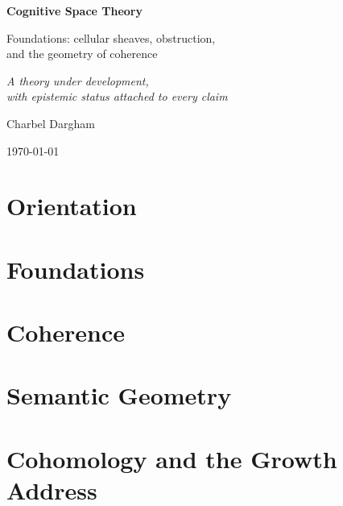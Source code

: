 \documentclass[11pt,openany]{book}
\begin{document}
\frontmatter

\begin{titlepage}
\centering
\vspace*{3cm}
{\Huge\bfseries Cognitive Space Theory\par}
\vspace{12pt}
{\Large Foundations: cellular sheaves, obstruction,\\[2pt]
 and the geometry of coherence\par}
\vspace{22pt}
{\normalsize\itshape A theory under development,\\[2pt]
 with epistemic status attached to every claim\par}
\vspace{3cm}
{\large Charbel Dargham\par}
\vspace{8pt}
{\normalsize\today\par}
\end{titlepage}



\tableofcontents

\mainmatter

\part{Orientation}\label{part:orientation}


\part{Foundations}\label{part:foundations}


\part{Coherence}


\part{Semantic Geometry}


\part{Cohomology and the Growth Address}


\end{document}
